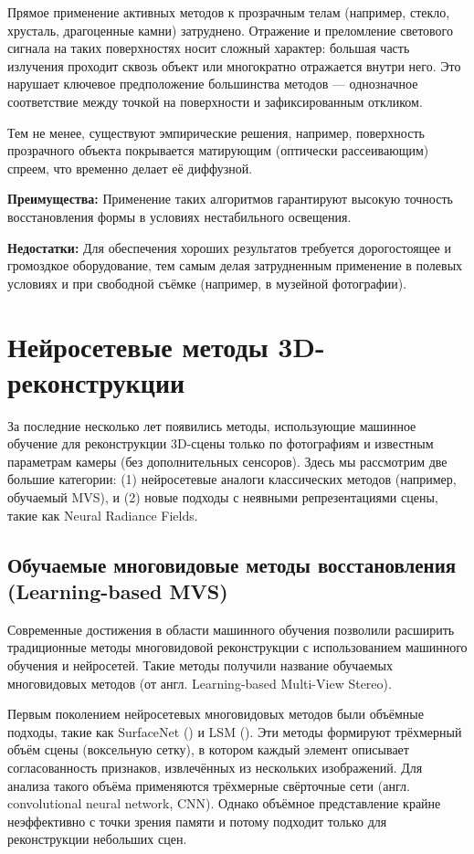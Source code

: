 Прямое применение активных методов к прозрачным телам (например, стекло,
хрусталь, драгоценные камни) затруднено. Отражение и преломление светового
сигнала на таких поверхностях носит сложный характер: большая часть излучения
проходит сквозь объект или многократно отражается внутри него. Это нарушает
ключевое предположение большинства методов — однозначное соответствие между
точкой на поверхности и зафиксированным откликом.

Тем не менее, существуют эмпирические решения, например, поверхность прозрачного
объекта покрывается матирующим (оптически рассеивающим) спреем, что временно делает
её диффузной.

\textbf{Преимущества:} Применение таких алгоритмов гарантируют высокую точность
восстановления формы в условиях нестабильного освещения.

\textbf{Недостатки:} Для обеспечения хороших результатов требуется дорогостоящее
и громоздкое оборудование, тем самым делая затрудненным применение в полевых
условиях и при свободной съёмке (например, в музейной фотографии).

\section{Нейросетевые методы 3D-реконструкции}

За последние несколько лет появились методы, использующие машинное обучение для
реконструкции 3D-сцены только по фотографиям и известным параметрам камеры (без
дополнительных сенсоров). Здесь мы рассмотрим две большие категории: (1)
нейросетевые аналоги классических методов (например, обучаемый MVS), и (2) новые
подходы с неявными репрезентациями сцены, такие как Neural Radiance
Fields.

\subsection{Обучаемые многовидовые методы восстановления (Learning-based MVS)}

Современные достижения в области машинного обучения позволили расширить
традиционные методы многовидовой реконструкции с использованием машинного
обучения и нейросетей. Такие методы получили название обучаемых многовидовых
методов (от англ. Learning-based Multi-View Stereo).

Первым поколением нейросетевых многовидовых методов были объёмные подходы, такие
как SurfaceNet (\cite{ji2017surfacenet}) и LSM
(\cite{kar2017learningmultiviewstereomachine}). Эти методы формируют трёхмерный
объём сцены (воксельную сетку), в котором каждый элемент описывает
согласованность признаков, извлечённых из нескольких изображений. Для анализа
такого объёма применяются трёхмерные свёрточные сети (англ. convolutional neural
network, CNN). Однако объёмное представление крайне неэффективно с точки зрения
памяти и потому подходит только для реконструкции небольших сцен.

